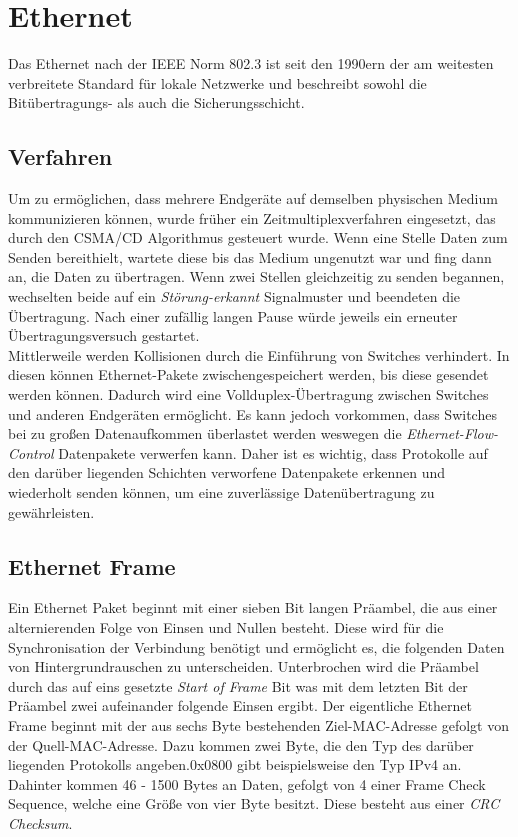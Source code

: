 \section{Ethernet}

Das Ethernet nach der IEEE Norm 802.3 ist seit den 1990ern der am weitesten verbreitete Standard für lokale Netzwerke und beschreibt sowohl die Bitübertragungs- als auch die Sicherungsschicht. \\
\subsection{Verfahren}
Um zu ermöglichen, dass mehrere Endgeräte auf demselben physischen Medium kommunizieren können, wurde früher ein Zeitmultiplexverfahren eingesetzt, das durch den CSMA/CD Algorithmus gesteuert wurde. Wenn eine Stelle Daten zum Senden bereithielt, wartete diese bis das Medium ungenutzt war und fing dann an, die Daten zu übertragen. Wenn zwei Stellen gleichzeitig zu senden begannen, wechselten beide auf ein \textit{Störung-erkannt} Signalmuster und beendeten die Übertragung. Nach einer zufällig langen Pause würde jeweils ein erneuter Übertragungsversuch gestartet.\\
Mittlerweile werden Kollisionen durch die Einführung von Switches verhindert. In diesen können Ethernet-Pakete zwischengespeichert werden, bis diese gesendet werden können. Dadurch wird eine Vollduplex-Übertragung zwischen Switches und anderen Endgeräten ermöglicht. Es kann jedoch vorkommen, dass Switches bei zu großen Datenaufkommen überlastet werden weswegen die \textit{Ethernet-Flow-Control} Datenpakete verwerfen kann. Daher ist es wichtig, dass Protokolle auf den darüber liegenden Schichten verworfene Datenpakete erkennen und wiederholt senden können, um eine zuverlässige Datenübertragung zu gewährleisten. \cite{Eth}

\subsection{Ethernet Frame}

Ein Ethernet Paket beginnt mit einer sieben Bit langen Präambel, die aus einer alternierenden Folge von Einsen und Nullen besteht. Diese wird für die Synchronisation der Verbindung benötigt und ermöglicht es, die folgenden Daten von Hintergrundrauschen zu unterscheiden. Unterbrochen wird die Präambel durch das auf eins gesetzte \textit{Start of Frame} Bit was mit dem letzten Bit der Präambel zwei aufeinander folgende Einsen ergibt. 
Der eigentliche Ethernet Frame beginnt mit der aus sechs Byte bestehenden Ziel-MAC-Adresse gefolgt von der Quell-MAC-Adresse. 
Dazu kommen zwei Byte, die den Typ des darüber liegenden Protokolls angeben.0x0800 gibt beispielsweise den Typ IPv4 an. Dahinter kommen 46 - 1500 Bytes an Daten, gefolgt von 4 einer Frame Check Sequence, welche eine Größe von vier Byte besitzt. Diese besteht aus einer  \textit{CRC Checksum}. \cite{Eth}



